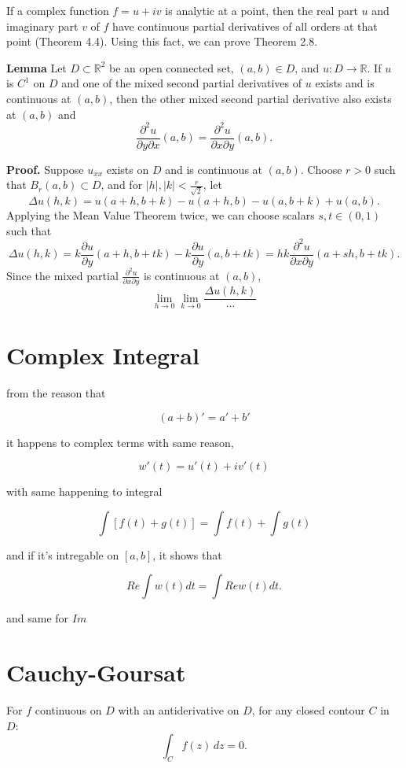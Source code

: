 \documentclass{article}
\begin{document}
If a complex function $f = u + iv$ is analytic at a point, then the real part $u$ and imaginary part $v$ of $f$ have continuous partial derivatives of all orders at that point (Theorem 4.4). Using this fact, we can prove Theorem 2.8.

\textbf{Lemma } Let $D \subset \mathbb{R}^2$ be an open connected set, $(a,b) \in D$, and $u : D \to \mathbb{R}$. If $u$ is $C^1$ on $D$ and one of the mixed second partial derivatives of $u$ exists and is continuous at $(a,b)$, then the other mixed second partial derivative also exists at $(a,b)$ and
\[
\frac{\partial^2 u}{\partial y \partial x}(a,b) = \frac{\partial^2 u}{\partial x \partial y}(a,b).
\]

\textbf{Proof.} Suppose $u_{xx}$ exists on $D$ and is continuous at $(a,b)$. Choose $r > 0$ such that $B_r(a,b) \subset D$, and for $|h|, |k| < \frac{r}{\sqrt{2}}$, let
\[
\Delta u(h,k) = u(a+h, b+k) - u(a+h, b) - u(a, b+k) + u(a,b).
\]
Applying the Mean Value Theorem twice, we can choose scalars $s, t \in (0,1)$ such that
\[
\Delta u(h,k) = k\frac{\partial u}{\partial y}(a+h, b+tk) - k\frac{\partial u}{\partial y}(a, b+tk) = hk\frac{\partial^2 u}{\partial x \partial y}(a+sh, b+tk).
\]
Since the mixed partial $\frac{\partial^2 u}{\partial x \partial y}$ is continuous at $(a,b)$,
\[
\lim_{h \to 0} \lim_{k \to 0} \frac{\Delta u(h,k)}{\cdots}
\]

\section*{Complex Integral}

from the reason that 

\[
(a+b)'=a'+b'
\]

it happens to complex terms with same reason, 

\[
w'(t)=u'(t)+iv'(t)
\]

with same happening to integral

\[
\int{[f(t)+g(t)]}=\int{f(t)}+\int{g(t)}
\]

and if it's intregable on $[a,b]$, it shows that 

\[
Re\int{w(t)}dt=\int{Rew(t)dt}. 
\]

and same for $Im$

\section*{Cauchy-Goursat}

For $f$ continuous on $D$ with an antiderivative on $D$, for any closed contour $C$ in $D$:
\[
\int_C f(z)\,dz = 0. 
\]
\end{document}
